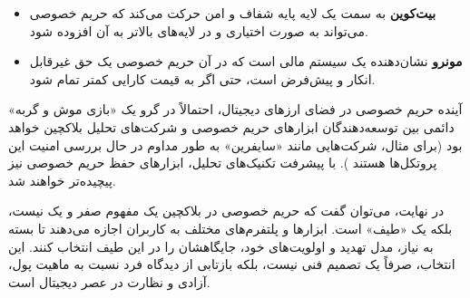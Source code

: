 \begin{itemize}
	\item \textbf{بیت‌کوین} به سمت یک لایه پایه شفاف و امن حرکت می‌کند که حریم خصوصی می‌تواند به صورت اختیاری و در لایه‌های بالاتر به آن افزوده شود.
	\item \textbf{مونرو} نشان‌دهنده یک سیستم مالی است که در آن حریم خصوصی یک حق غیرقابل انکار و پیش‌فرض است، حتی اگر به قیمت کارایی کمتر تمام شود.
\end{itemize}

آینده حریم خصوصی در فضای ارزهای دیجیتال، احتمالاً در گرو یک «بازی موش و گربه» دائمی بین توسعه‌دهندگان ابزارهای حریم خصوصی و شرکت‌های تحلیل بلاکچین خواهد بود (برای مثال، شرکت‌هایی مانند «سایفرین» به طور مداوم در حال بررسی امنیت این پروتکل‌ها هستند \cite{cyfrin_website}). با پیشرفت تکنیک‌های تحلیل، ابزارهای حفظ حریم خصوصی نیز پیچیده‌تر خواهند شد.

در نهایت، می‌توان گفت که حریم خصوصی در بلاکچین یک مفهوم صفر و یک نیست، بلکه یک «طیف» است. ابزارها و پلتفرم‌های مختلف به کاربران اجازه می‌دهند تا بسته به نیاز، مدل تهدید و اولویت‌های خود، جایگاهشان را در این طیف انتخاب کنند. این انتخاب، صرفاً یک تصمیم فنی نیست، بلکه بازتابی از دیدگاه فرد نسبت به ماهیت پول، آزادی و نظارت در عصر دیجیتال است.